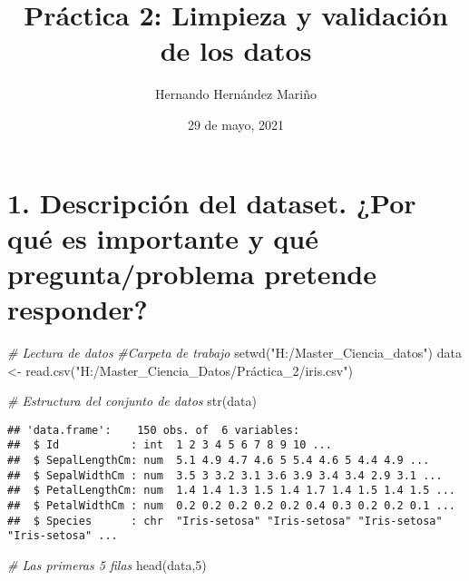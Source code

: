 \documentclass[
]{article}
\title{Práctica 2: Limpieza y validación de los datos}
\author{Hernando Hernández Mariño}
\date{29 de mayo, 2021}
\newenvironment{Shaded}{\begin{snugshade}}{\end{snugshade}}
\newcommand{\CommentTok}[1]{\textcolor[rgb]{0.56,0.35,0.01}{\textit{#1}}}
\newcommand{\DecValTok}[1]{\textcolor[rgb]{0.00,0.00,0.81}{#1}}
\newcommand{\FunctionTok}[1]{\textcolor[rgb]{0.00,0.00,0.00}{#1}}
\newcommand{\NormalTok}[1]{#1}
\newcommand{\OtherTok}[1]{\textcolor[rgb]{0.56,0.35,0.01}{#1}}
\newcommand{\StringTok}[1]{\textcolor[rgb]{0.31,0.60,0.02}{#1}}
\begin{document}
\maketitle

\hypertarget{descripciuxf3n-del-dataset.-por-quuxe9-es-importante-y-quuxe9-preguntaproblema-pretende-responder}{%
\section{1. Descripción del dataset. ¿Por qué es importante y qué
pregunta/problema pretende
responder?}\label{descripciuxf3n-del-dataset.-por-quuxe9-es-importante-y-quuxe9-preguntaproblema-pretende-responder}}

\begin{Shaded}
\begin{Highlighting}[]
\CommentTok{\# Lectura de datos}
\CommentTok{\#Carpeta de trabajo}
\FunctionTok{setwd}\NormalTok{(}\StringTok{"H:/Master\_Ciencia\_datos"}\NormalTok{)}
\NormalTok{data }\OtherTok{\textless{}{-}} \FunctionTok{read.csv}\NormalTok{(}\StringTok{"H:/Master\_Ciencia\_Datos/Práctica\_2/iris.csv"}\NormalTok{)}
\end{Highlighting}
\end{Shaded}

\begin{Shaded}
\begin{Highlighting}[]
\CommentTok{\# Estructura del conjunto de datos}
\FunctionTok{str}\NormalTok{(data)}
\end{Highlighting}
\end{Shaded}

\begin{verbatim}
## 'data.frame':    150 obs. of  6 variables:
##  $ Id           : int  1 2 3 4 5 6 7 8 9 10 ...
##  $ SepalLengthCm: num  5.1 4.9 4.7 4.6 5 5.4 4.6 5 4.4 4.9 ...
##  $ SepalWidthCm : num  3.5 3 3.2 3.1 3.6 3.9 3.4 3.4 2.9 3.1 ...
##  $ PetalLengthCm: num  1.4 1.4 1.3 1.5 1.4 1.7 1.4 1.5 1.4 1.5 ...
##  $ PetalWidthCm : num  0.2 0.2 0.2 0.2 0.2 0.4 0.3 0.2 0.2 0.1 ...
##  $ Species      : chr  "Iris-setosa" "Iris-setosa" "Iris-setosa" "Iris-setosa" ...
\end{verbatim}

\begin{Shaded}
\begin{Highlighting}[]
\CommentTok{\# Las primeras 5 filas}
\FunctionTok{head}\NormalTok{(data,}\DecValTok{5}\NormalTok{)}
\end{Highlighting}
\end{Shaded}
\end{document}
